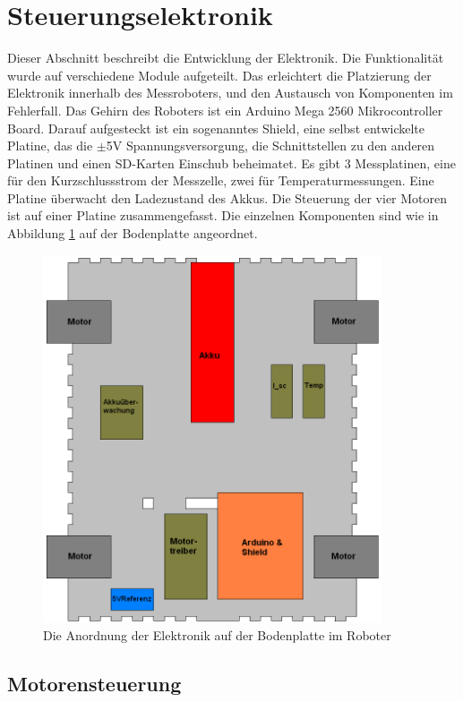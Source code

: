 \documentclass[a4paper,bibtotoc,oneside]{scrbook}
\begin{document}
\section{Steuerungselektronik}\thispagestyle{empty}

Dieser Abschnitt beschreibt die Entwicklung der Elektronik. Die Funktionalität wurde auf verschiedene Module aufgeteilt. Das erleichtert die Platzierung der Elektronik innerhalb des Messroboters, und den Austausch von Komponenten im Fehlerfall. 
Das Gehirn des Roboters ist ein Arduino Mega 2560 Mikrocontroller Board. Darauf aufgesteckt ist ein sogenanntes Shield, eine selbst entwickelte Platine, das die $\pm$5V Spannungsversorgung, die Schnittstellen zu den anderen Platinen und einen SD-Karten Einschub beheimatet.
Es gibt 3 Messplatinen, eine für den Kurzschlussstrom der Messzelle, zwei für Temperaturmessungen. Eine Platine überwacht den Ladezustand des Akkus. Die Steuerung der vier Motoren ist auf einer Platine zusammengefasst.
Die einzelnen Komponenten sind wie in Abbildung \ref{elek} auf der Bodenplatte angeordnet.
\begin{figure}[htbp]
\centering
\includegraphics[width=100mm]{img/bodenplatte.png}
\caption{Die Anordnung der Elektronik auf der Bodenplatte im Roboter}\label{elek}
\end{figure}
 
\subsection{Motorensteuerung}\thispagestyle{empty}
\end{document}

